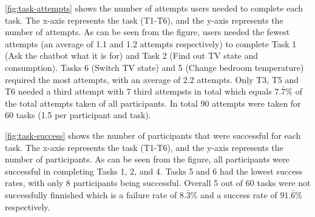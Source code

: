 \cref{fig:task-attempts} shows the number of attempts users needed to complete each task. The x-axis represents the task (T1-T6), and the y-axis represents the number of attempts. As can be seen from the figure, users needed the fewest attempts (an average of 1.1 and 1.2 attempts respectively) to complete Task 1 (Ask the chatbot what it is for) and Task 2 (Find out TV state and consumption). Tasks 6 (Switch TV state) and 5 (Change bedroom temperature) required the most attempts, with an average of 2.2 attempts.
Only T3, T5 and T6 needed a third attempt with 7 third attempsts in total which equals $7.\bar{7}\%$ of the total attempts taken of all participants. In total 90 attempts were taken for 60 tasks (1.5 per participant and task). 

\cref{fig:task-success} shows the number of participants that were successful for each task. The x-axis represents the task (T1-T6), and the y-axis represents the number of participants. As can be seen from the figure, all participants were successful in completing Tasks 1, 2, and 4. Tasks 5 and 6 had the lowest success rates, with only 8 participants being successful. Overall 5 out of 60 tasks were not successfully finnished which is a failure rate of $8.\bar{3}\%$ and a success rate of $91.\bar{6}\%$ respectively.

